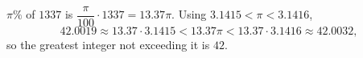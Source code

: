 $\pi\%$ of $1337$ is $\dfrac{\pi}{100}\cdot1337=13.37\pi$. Using $3.1415<\pi<3.1416$,
\[42.0019\approx13.37\cdot3.1415<13.37\pi<13.37\cdot3.1416\approx42.0032,\]
so the greatest integer not exceeding it is $\boxed{42}$.
